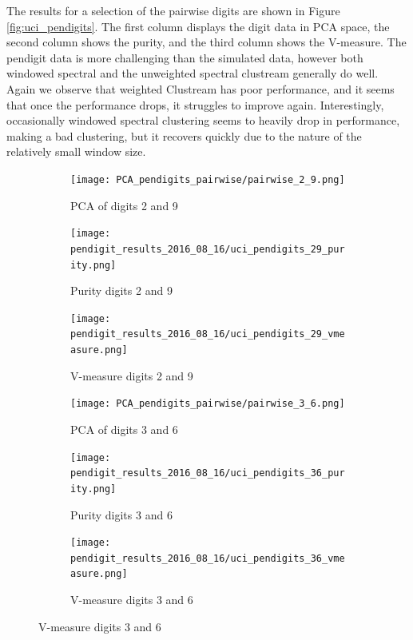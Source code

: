 The results for a selection of the pairwise digits are shown in Figure \ref{fig:uci_pendigits}. The first column displays the digit data in PCA space, the second column shows the purity, and the third column shows the V-measure. The pendigit data is more challenging than the simulated data, however both windowed spectral and the unweighted spectral clustream generally do well. Again we observe that weighted Clustream has poor performance, and it seems that once the performance drops, it struggles to improve again. Interestingly, occasionally windowed spectral clustering seems to heavily drop in performance, making a bad clustering, but it recovers quickly due to the nature of the relatively small window size. 


\begin{figure}[H]
\begin{subfigure}{.3\textwidth}
  \centering
  \texttt{[image: PCA\_pendigits\_pairwise/pairwise\_2\_9.png]}
  \caption{PCA of digits 2 and 9}
\end{subfigure}%
\begin{subfigure}{.3\textwidth}
  \centering
  \texttt{[image: pendigit\_results\_2016\_08\_16/uci\_pendigits\_29\_purity.png]}
  \caption{Purity digits 2 and 9}
\end{subfigure}
\begin{subfigure}{.3\textwidth}
  \centering
  \texttt{[image: pendigit\_results\_2016\_08\_16/uci\_pendigits\_29\_vmeasure.png]}
  \caption{V-measure digits 2 and 9}
\end{subfigure}


\begin{subfigure}{.3\textwidth}
  \centering
  \texttt{[image: PCA\_pendigits\_pairwise/pairwise\_3\_6.png]}
  \caption{PCA of digits 3 and 6}
\end{subfigure}%
\begin{subfigure}{.3\textwidth}
  \centering
  \texttt{[image: pendigit\_results\_2016\_08\_16/uci\_pendigits\_36\_purity.png]}
  \caption{Purity digits 3 and 6}
\end{subfigure}
\begin{subfigure}{.3\textwidth}
  \centering
  \texttt{[image: pendigit\_results\_2016\_08\_16/uci\_pendigits\_36\_vmeasure.png]}
  \caption{V-measure digits 3 and 6}
\end{subfigure}


\end{figure}
